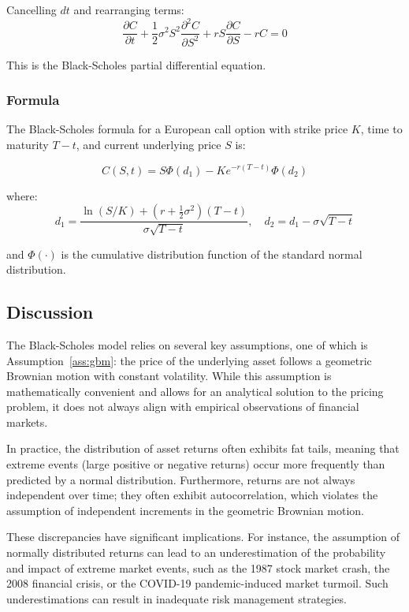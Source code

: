 Cancelling \( dt \) and rearranging terms:
\[
\frac{\partial C}{\partial t} + \frac{1}{2} \sigma^2 S^2 \frac{\partial^2 C}{\partial S^2} + r S \frac{\partial C}{\partial S} - rC = 0
\]

This is the Black-Scholes partial differential equation.

\subsubsection{Formula}

The Black-Scholes formula for a European call option with strike price \( K \), time to maturity \( T - t \), and current underlying price \( S \) is:

\[
C(S,t) = S \Phi(d_1) - K e^{-r(T - t)} \Phi(d_2)
\]

where:
\[
d_1 = \frac{\ln(S/K) + (r + \frac{1}{2} \sigma^2)(T - t)}{\sigma \sqrt{T - t}}, \quad
d_2 = d_1 - \sigma \sqrt{T - t}
\]

and \( \Phi(\cdot) \) is the cumulative distribution function of the standard normal distribution.

\subsection{Discussion}
The Black-Scholes model relies on several key assumptions, one of which is Assumption~\ref{ass:gbm}: the price of the underlying asset follows a geometric Brownian motion with constant volatility. While this assumption is mathematically convenient and allows for an analytical solution to the pricing problem, it does not always align with empirical observations of financial markets.

In practice, the distribution of asset returns often exhibits fat tails, meaning that extreme events (large positive or negative returns) occur more frequently than predicted by a normal distribution. Furthermore, returns are not always independent over time; they often exhibit autocorrelation, which violates the assumption of independent increments in the geometric Brownian motion.

These discrepancies have significant implications. For instance, the assumption of normally distributed returns can lead to an underestimation of the probability and impact of extreme market events, such as the 1987 stock market crash, the 2008 financial crisis, or the COVID-19 pandemic-induced market turmoil. Such underestimations can result in inadequate risk management strategies.

